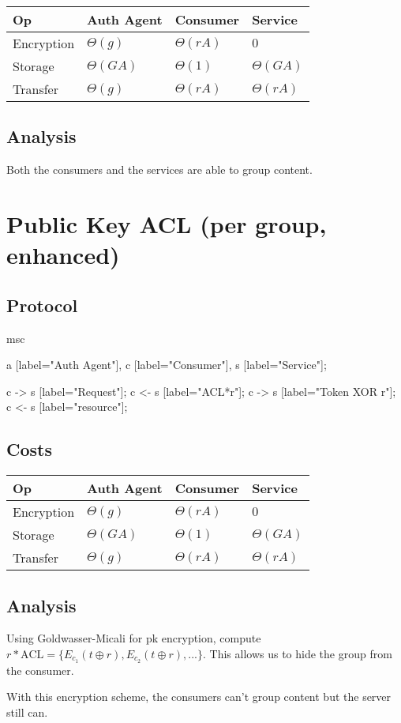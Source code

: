 \documentclass[pdftex,12pt,a4papaer]{article}
\begin{document}
\begin{tabular}{l|l|l|l}
 Op & Auth Agent & Consumer & Service \\ \hline
 Encryption & $\Theta(g)$ & $\Theta(rA)$ & $0$ \\
    Storage & $\Theta(GA)$ & $\Theta(1)$ & $\Theta(GA)$ \\
   Transfer & $\Theta(g)$ & $\Theta(rA)$ & $\Theta(rA)$
\end{tabular}


\subsection{Analysis}

Both the consumers and the services are able to group content.

\pagebreak

\section{Public Key ACL (per group, enhanced)}  %

\subsection{Protocol}

\begin{msc}
msc {
    a [label="Auth Agent"],
    c [label="Consumer"],
    s [label="Service"];

    c -> s [label="Request"];
    c <- s [label="ACL*r"];
    c -> s [label="Token XOR r"];
    c <- s [label="resource"];
}
\end{msc}

\subsection{Costs}

\begin{tabular}{l|l|l|l}
 Op & Auth Agent & Consumer & Service \\ \hline
 Encryption & $\Theta(g)$ & $\Theta(rA)$ & $0$ \\
    Storage & $\Theta(GA)$ & $\Theta(1)$ & $\Theta(GA)$ \\
    Transfer & $\Theta(g)$ & $\Theta(rA)$ & $\Theta(rA)$
\end{tabular}

\subsection{Analysis}

Using Goldwasser-Micali for pk encryption, compute $r*\text{ACL} = \{E_{c_1}(t
\oplus r), E_{c_2}(t \oplus r),...\}$. This allows us to hide the group from the
consumer.

With this encryption scheme, the consumers can't group content but the server
still can.

\pagebreak
\end{document}
